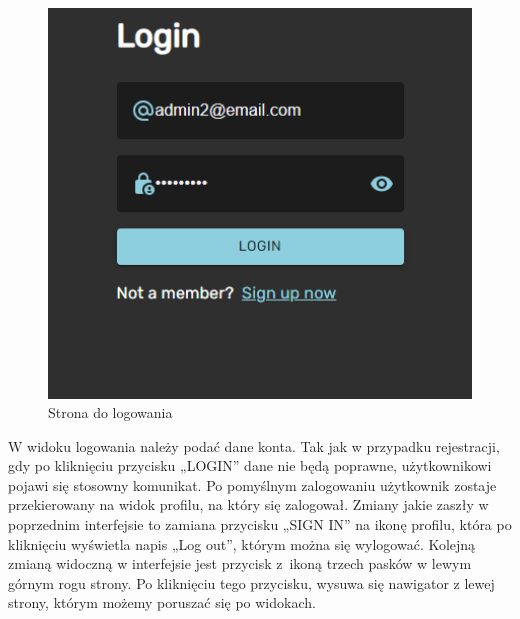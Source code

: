 \documentclass[a4paper,twoside,12pt]{book}
\begin{document}
\begin{figure}[H]
    \centering
    \includegraphics[width=1\textwidth]{webowka_ss/login.png}
    \caption{Strona do logowania}
\end{figure}
W widoku logowania należy podać dane konta. Tak jak w przypadku rejestracji, gdy po kliknięciu przycisku „LOGIN” dane nie będą poprawne, użytkownikowi pojawi się stosowny komunikat. Po pomyślnym zalogowaniu użytkownik zostaje przekierowany na widok profilu, na który się zalogował. Zmiany jakie zaszły w poprzednim interfejsie to zamiana przycisku „SIGN IN” na ikonę profilu, która po kliknięciu  wyświetla napis „Log out”, którym można się wylogować. Kolejną zmianą widoczną w interfejsie jest przycisk z~ikoną trzech pasków w lewym górnym rogu strony. Po kliknięciu tego przycisku, wysuwa się nawigator z lewej strony, którym możemy poruszać się po widokach.
\end{document}
